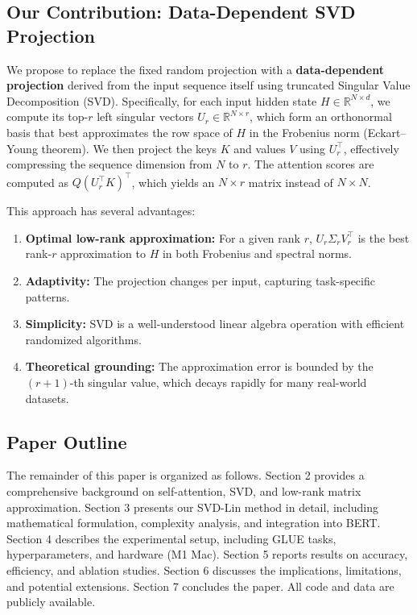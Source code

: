 \documentclass[twocolumn]{article}
\begin{document}
\subsection{Our Contribution: Data-Dependent SVD Projection}
We propose to replace the fixed random projection with a \textbf{data-dependent projection} derived from the input sequence itself using truncated Singular Value Decomposition (SVD). Specifically, for each input hidden state $H \in \mathbb{R}^{N \times d}$, we compute its top-$r$ left singular vectors $U_r \in \mathbb{R}^{N \times r}$, which form an orthonormal basis that best approximates the row space of $H$ in the Frobenius norm (Eckart–Young theorem). We then project the keys $K$ and values $V$ using $U_r^\top$, effectively compressing the sequence dimension from $N$ to $r$. The attention scores are computed as $Q (U_r^\top K)^\top$, which yields an $N \times r$ matrix instead of $N \times N$.

This approach has several advantages:
\begin{enumerate}
    \item \textbf{Optimal low-rank approximation:} For a given rank $r$, $U_r \Sigma_r V_r^\top$ is the best rank-$r$ approximation to $H$ in both Frobenius and spectral norms.
    \item \textbf{Adaptivity:} The projection changes per input, capturing task-specific patterns.
    \item \textbf{Simplicity:} SVD is a well-understood linear algebra operation with efficient randomized algorithms.
    \item \textbf{Theoretical grounding:} The approximation error is bounded by the $(r+1)$-th singular value, which decays rapidly for many real-world datasets.
\end{enumerate}

\subsection{Paper Outline}
The remainder of this paper is organized as follows. Section 2 provides a comprehensive background on self-attention, SVD, and low-rank matrix approximation. Section 3 presents our SVD-Lin method in detail, including mathematical formulation, complexity analysis, and integration into BERT. Section 4 describes the experimental setup, including GLUE tasks, hyperparameters, and hardware (M1 Mac). Section 5 reports results on accuracy, efficiency, and ablation studies. Section 6 discusses the implications, limitations, and potential extensions. Section 7 concludes the paper. All code and data are publicly available.
\end{document}
